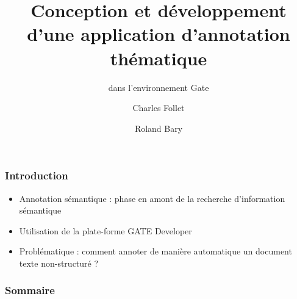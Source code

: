 \documentclass[10pt, compress]{beamer}
\title{Conception et développement d’une application d’annotation thématique}
\subtitle{dans l’environnement Gate}
\date{}
\author{Charles Follet \and Roland Bary}
\institute{Université de Pau et des Pays de l'Adour}
\begin{document}
\maketitle
\begin{frame}[fragile]
	\frametitle{Introduction}
		\begin{itemize}[<+->]
  			[square]
  			\item{Annotation sémantique : phase en amont de la recherche d'information sémantique}
  			\item{Utilisation de la plate-forme GATE Developer}
  			\item{Problématique : comment annoter de manière automatique un document texte non-structuré ?}		
  		\end{itemize}
\end{frame}
\begin{frame}[fragile]
  \frametitle{Sommaire}
  \tableofcontents
\end{frame}
\end{document}
